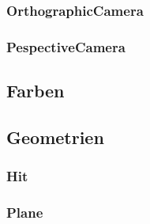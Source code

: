 \documentclass[14pt]{extarticle}
\begin{document}
\subsubsection{OrthographicCamera}
\subsubsection{PespectiveCamera}  
\subsection{Farben}

\subsection{Geometrien}
\subsubsection{Hit}
\subsubsection{Plane}
\end{document}
